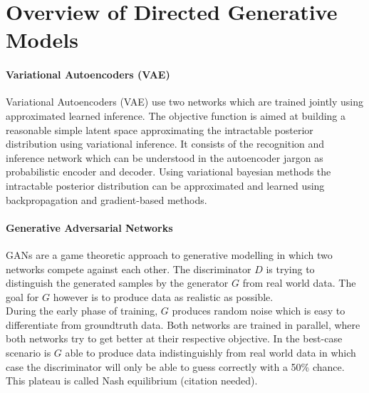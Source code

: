 \section{Overview of Directed Generative Models}
\label{sec:overview}


\paragraph{Variational Autoencoders (VAE) \cite{vae:2013}\cite{rezende:2014}}
\label{par:overview_vae}
Variational Autoencoders (VAE) use two networks which are trained jointly using approximated learned inference.
The objective function is aimed at building a reasonable simple latent space approximating the intractable posterior distribution using variational inference.
It consists of the recognition and inference network which can be understood in the autoencoder jargon as probabilistic encoder and decoder.
Using variational bayesian methods the intractable posterior distribution can be approximated and learned using backpropagation and gradient-based methods.








\paragraph{Generative Adversarial Networks}
\label{par:overview_gan}
GANs are a game theoretic approach to generative modelling
in which two networks compete against each other.
The discriminator $D$ is trying to distinguish the generated samples
by the generator $G$ from real world data.
The goal for $G$ however is to produce data as realistic as possible.\\
During the early phase of training, $G$ produces random noise which
is easy to differentiate from groundtruth data.
Both networks are trained in parallel, where both networks try to get better
at their respective objective.
In the best-case scenario is $G$ able to produce data indistinguishly from real world data in which
case the discriminator will only be able to guess correctly with a 50\% chance.
This plateau is called Nash equilibrium (citation needed).




